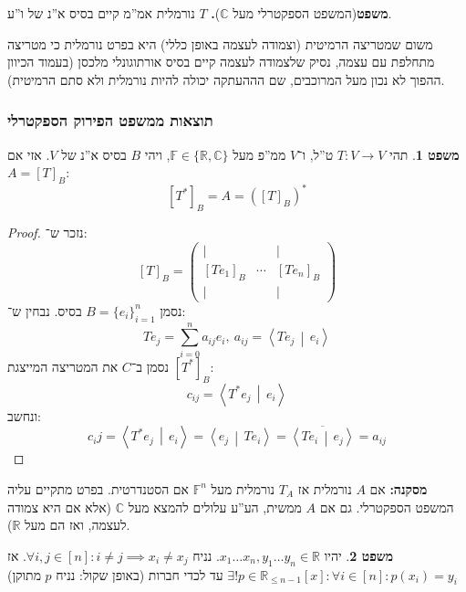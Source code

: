 \documentclass[a4paper]{article}
\newcommand\R     {\mathbb{R}}
\newcommand\C     {\mathbb{C}}
\newcommand\ra    {\rangle}
\newcommand\la    {\langle}
\newcommand\ol    {\overline}
\newcommand\sumni     {\sum_{i = 0}^{n}}
\newcommand\F         {\mathbb{F}}
\newcommand\co        {\colon}
\newcommand\pms[1]    {\begin{pmatrix}
		#1
\end{pmatrix}}
\newcommand\mut [2]   {\left \la #1 \,\middle\vert\, #2 \right \ra}
\theoremstyle{definition}
\newtheorem{Theorem}{\color{myblue}משפט}
\newcommand\theo  [1] {\begin{Theorem}#1\end{Theorem}}
\begin{document}
	\textbf{משפט}{(המשפט הספקטרלי מעל $\C$)\textbf{. } $T$ נורמלית אמ''מ קיים בסיס א''נ של ו''ע. }
	
	משום שמטריצה הרמיטית (וצמודה לעצמה באופן כללי) היא בפרט נורמלית כי מטריצה מתחלפת עם עצמה, נסיק שלצמודה לעצמה קיים בסיס אורתוגונלי מלכסן (בעמוד הכיוון ההפוך לא נכון מעל המרוכבים, שם הההעתקה יכולה להיות נורמלית ולא סתם הרמיטית). 
	
	\subsubsection{תוצאות ממשפט הפירוק הספקטרלי}
	
	\theo{תהי $T \co V \to V$ ט''ל, ו־$V$ ממ''פ מעל $\F \in \{\R, \C\}$, ויהי $B$ בסיס א''נ של $V$. אזי אם $A = [T]_B$: 
		\[ [T^*]_B = A = ([T]_B)^* \]}  
	\begin{proof}
		נזכר ש־: 
		\[ [T]_B = \pms{\vert &  & \vert \\ [Te_1]_B & \cdots & [Te_n]_B \\ \vert &  & \vert} \]
		נסמן $B = \{e_i\}_{i = 1}^{n}$ בסיס. נבחין ש־: 
		\[ Te_j = \sumni a_{ij}e_i, \ a_{ij} = \mut{Te_j}{e_i} \]
		נסמן ב־$C$ את המטריצה המייצגת $[T^*]_B$: 
		\[ c_{ij} = \mut{T^*e_j}{e_i} \]
		ונחשב: 
		\[ c_ij = \mut{T^*e_j}{e_i} = \mut{e_j}{Te_i} = \ol{\mut{Te_i}{e_j}} = a_{ij} \]
		
	\end{proof}
	
	\textbf{מסקנה: }אם $A$ נורמלית אז $T_A$ נורמלית מעל $\F^n$ אם הסטנדרטית. בפרט מתקיים עליה המשפט הספקטרלי. גם אם $A$ ממשית, הע''ע עלולים להמצא מעל $\C$ (אלא אם היא צמודה לעצמה, ואז הם מעל $\R$). 
	
	\theo{יהיו $x_1 \dots x_n, y_1 \dots y_n \in \R$. נניח $\forall i, j \in [n] \co i \neq j \implies x_i \neq x_j$. אז $\exists! p \in \R_{\le n - 1}[x] \co \forall i \in [n] \co p(x_i) = y_i$ עד לכדי חברות (באופן שקול: נניח $p$ מתוקן) }
	
\end{document}
